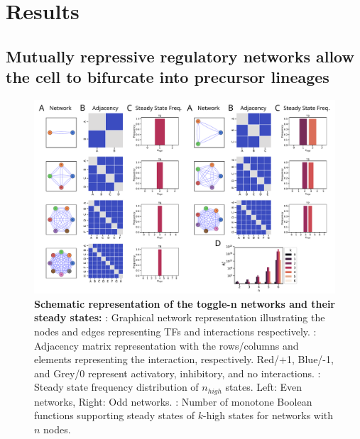 \documentclass[11pt,a4paper]{article}
\theoremstyle{definition}
\theoremstyle{remark}
\begin{document}
\section{Results}

\subsection{Mutually repressive regulatory networks allow the cell to bifurcate into precursor lineages}
\begin{figure}[!ht]
    \begin{subfigure}[c]{\textwidth}
        \label{graph}
    \end{subfigure}
    \begin{subfigure}[c]{\textwidth}
        \label{adjmat}
    \end{subfigure}
    \begin{subfigure}[c]{\textwidth}
        \label{ssfreq}
    \end{subfigure}
    \begin{subfigure}[c]{\textwidth}
        \label{mbfs-phi}
    \end{subfigure}
    \centering
    \includegraphics[width=\textwidth]{figures/Figure1}
    \caption{\textbf{Schematic representation of the toggle-n networks and their steady states:} : Graphical network representation illustrating the nodes and edges representing TFs and interactions respectively. : Adjacency matrix representation with the rows/columns and elements representing the interaction, respectively. Red/+1, Blue/-1, and Grey/0 represent activatory, inhibitory, and no interactions. : Steady state frequency distribution of $n_{high}$ states. Left: Even networks, Right: Odd networks. : Number of monotone Boolean functions supporting steady states of $k$-high states for networks with $n$ nodes.}
    \label{networks}
\end{figure}
\end{document}
